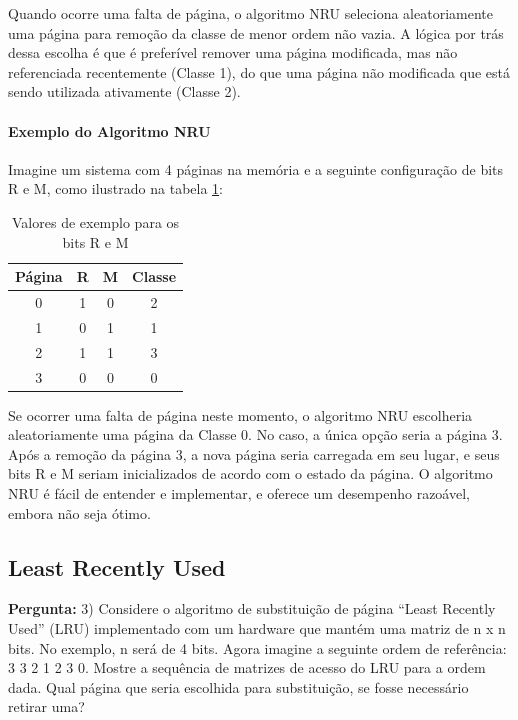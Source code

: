 \documentclass{article}
\begin{document}
Quando ocorre uma falta de página, o algoritmo NRU seleciona aleatoriamente uma página para remoção da classe de menor ordem não vazia. A lógica por trás dessa escolha é que é preferível remover uma página modificada, mas não referenciada recentemente (Classe 1), do que uma página não modificada que está sendo utilizada ativamente (Classe 2).

\newpage
\paragraph {Exemplo do Algoritmo NRU\newline}

Imagine um sistema com 4 páginas na memória e a seguinte configuração de bits R e M, como ilustrado na tabela \ref{tab:ReM}:
\begin{table}[h!]
    \centering
    \begin{tabular}{|c|c|c|c|}
    \hline
    \textbf{Página} & \textbf{R} & \textbf{M} & \textbf{Classe} \\ \hline
    0 & 1 & 0 & 2 \\ \hline
    1 & 0 & 1 & 1 \\ \hline
    2 & 1 & 1 & 3 \\ \hline
    3 & 0 & 0 & 0 \\ \hline
    \end{tabular}
    \caption{Valores de exemplo para os bits R e M}
    \label{tab:ReM}
\end{table}

Se ocorrer uma falta de página neste momento, o algoritmo NRU escolheria aleatoriamente uma página da Classe 0. No caso, a única opção seria a página 3. Após a remoção da página 3, a nova página seria carregada em seu lugar, e seus bits R e M seriam inicializados de acordo com o estado da página. O algoritmo NRU é fácil de entender e implementar, e oferece um desempenho razoável, embora não seja ótimo.


\subsection{Least Recently Used}

\textbf{Pergunta:} 3) Considere o algoritmo de substituição de página “Least Recently Used” (LRU) implementado com um hardware que mantém uma matriz de n x n bits. No exemplo, n será de 4 bits. Agora imagine a seguinte ordem de referência: 3 3 2 1 2 3 0. Mostre a sequência de matrizes de acesso do LRU para a ordem dada. Qual página que seria escolhida para substituição, se fosse necessário retirar uma?  \newline
\end{document}
